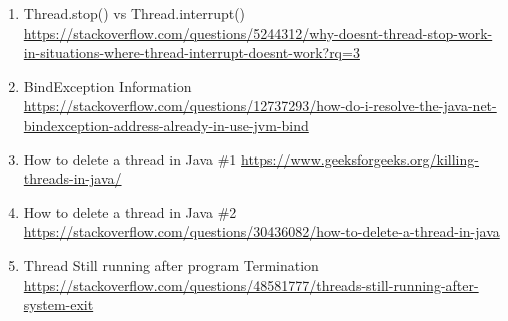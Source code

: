 \begin{enumerate}
        \item Thread.stop() vs Thread.interrupt() \url{https://stackoverflow.com/questions/5244312/why-doesnt-thread-stop-work-in-situations-where-thread-interrupt-doesnt-work?rq=3}
        
        \item BindException Information \url{https://stackoverflow.com/questions/12737293/how-do-i-resolve-the-java-net-bindexception-address-already-in-use-jvm-bind}
        
        \item How to delete a thread in Java \#1 \url{https://www.geeksforgeeks.org/killing-threads-in-java/}
        
        \item How to delete a thread in Java \#2 \url{https://stackoverflow.com/questions/30436082/how-to-delete-a-thread-in-java}
        
        \item Thread Still running after program Termination \url{https://stackoverflow.com/questions/48581777/threads-still-running-after-system-exit}
    \end{enumerate}
        
        
